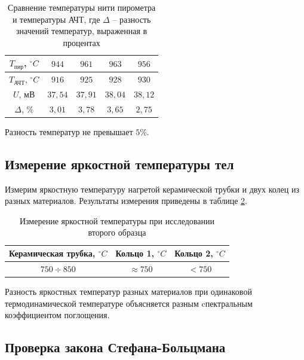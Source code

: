 \documentclass[a4paper]{article}
\begin{document}
\begin{table}[!ht]
    \centering
    \begin{tabular}{|c|c|c|c|c|}
    \hline
    $T_{\text{пир}}$, $^\circ C$ & $944$   & $961$   & $963$   & $956$   \\ \hline
    $T_{\text{АЧТ}}$, $^\circ C$ & $916$   & $925$   & $928$   & $930$   \\ \hline
    $U$, мВ                      & $37,54$ & $37,91$ & $38,04$ & $38,12$ \\ \hline
    $\Delta$, \%                 & $3,01$  & $3,78$  & $3,65$  & $2,75$  \\ \hline
    \end{tabular}
    \caption{Сравнение температуры нити пирометра и температуры АЧТ, где $\Delta$ -- разность значений температур, выраженная в процентах}
    \label{table:diff1}
    \end{table}

\noindent Разность температур не превышает $5\%$.

\subsection{Измерение яркостной температуры тел}

Измерим яркостную температуру нагретой керамической трубки и двух колец из разных материалов. Результаты измерения приведены в таблице \ref*{table:diff2}.

\begin{table}[!ht]
    \centering
    \begin{tabular}{|c|c|c|}
    \hline
    Керамическая трубка, $^\circ C$ & Кольцо 1, $^\circ C$ & Кольцо 2, $^\circ C$ \\ \hline
    $750 \div 850$                 & $\approx 750$        & $< 750$              \\ \hline
    \end{tabular}
    \caption{Измерение яркостной температуры при исследовании второго образца}
    \label{table:diff2}
\end{table}

\noindent Разность яркостных температур разных материалов при одинаковой термодинамической температуре объясняется разным  cпектральным коэффициентом поглощения.

\subsection{Проверка закона Стефана-Больцмана}
\end{document}
